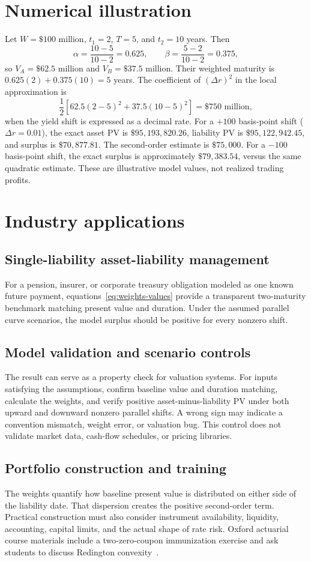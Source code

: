 \documentclass[11pt]{article}
\begin{document}
\section{Numerical illustration}
Let \(W=\$100\) million, \(t_1=2\), \(T=5\), and \(t_2=10\) years. Then
\[
 \alpha=\frac{10-5}{10-2}=0.625,\qquad
 \beta=\frac{5-2}{10-2}=0.375,
\]
so \(V_A=\$62.5\) million and \(V_B=\$37.5\) million. Their weighted maturity is \(0.625(2)+0.375(10)=5\) years. The coefficient of \((\Delta r)^2\) in the local approximation is
\[
 \frac12[62.5(2-5)^2+37.5(10-5)^2]=\$750\text{ million},
\]
when the yield shift is expressed as a decimal rate. For a \(+100\) basis-point shift (\(\Delta r=0.01\)), the exact asset PV is \(\$95{,}193{,}820.26\), liability PV is \(\$95{,}122{,}942.45\), and surplus is \(\$70{,}877.81\). The second-order estimate is \(\$75{,}000\). For a \(-100\) basis-point shift, the exact surplus is approximately \(\$79{,}383.54\), versus the same quadratic estimate. These are illustrative model values, not realized trading profits.

\section{Industry applications}
\subsection{Single-liability asset-liability management}
For a pension, insurer, or corporate treasury obligation modeled as one known future payment, equations~\eqref{eq:weights-values} provide a transparent two-maturity benchmark matching present value and duration. Under the assumed parallel curve scenarios, the model surplus should be positive for every nonzero shift.

\subsection{Model validation and scenario controls}
The result can serve as a property check for valuation systems. For inputs satisfying the assumptions, confirm baseline value and duration matching, calculate the weights, and verify positive asset-minus-liability PV under both upward and downward nonzero parallel shifts. A wrong sign may indicate a convention mismatch, weight error, or valuation bug. This control does not validate market data, cash-flow schedules, or pricing libraries.

\subsection{Portfolio construction and training}
The weights quantify how baseline present value is distributed on either side of the liability date. That dispersion creates the positive second-order term. Practical construction must also consider instrument availability, liquidity, accounting, capital limits, and the actual shape of rate risk. Oxford actuarial course materials include a two-zero-coupon immunization exercise and ask students to discuss Redington convexity~\cite{oxford}.
\end{document}
